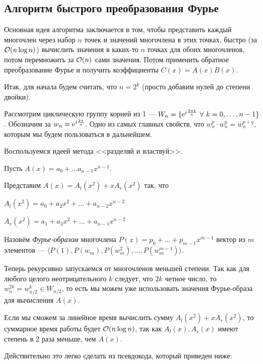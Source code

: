 \documentclass[a4paper, 12pt]{article}
\begin{document}
\subsection{Алгоритм быстрого преобразования Фурье}

Основная идея алгоритма заключается в том, чтобы представить каждый многочлен
через набор $n$ точек и значений многочлена в этих точках, быстро (за $\mathcal{O}(n\log n)$) вычислить значения в каких-то $n$ точках для обоих многочленов, потом
перемножить за $\mathcal{O}(n)$ сами значения. Потом применить обратное преобразование
Фурье и получить коэффициенты $C(x) = A(x)B(x)$.

Итак, для начала будем считать, что $n = 2^k$ (просто добавим нулей до степени двойки).

Рассмотрим циклическую группу корней из 1 --- $W_n = \{\e^{i\frac{2\pi k}{n}} \ 
\forall \ k = 0, \ldots, n - 1\}$. Обозначим за $w_n = \mathrm{e}^{i\frac{2\pi}{n}}$.
Одно из самых главных свойств, что $w_n^{p} \cdot w_n^{q} = w_n^{p + q}$,
которым мы будем пользоваться в дальнейшем.

Воспользуемся идеей метода <<разделяй и властвуй>>.

Пусть $A(x) = a_0 + \ldots a_{n - 1}x^{n - 1}$.

Представим $A(x) = A_l(x^2) + xA_r(x^2)$ так, что

\begin{center}
  $A_l(x^2) = a_0 + a_2x^2 + \ldots + a_{n - 2}x^{n - 2}$

  $A_r(x^2) = a_1 + a_3x^2 + \ldots + a_{n - 1}x^{n - 2}$
\end{center}

\begin{Def}
  \rm{Назовём \textit{Фурье-образом} многочлена $P(x) = p_0 + \ldots + 
  p_{m - 1}x^{m - 1}$ вектор из $m$ элементов ---  $\langle P(1), P(w_m), P(w_m^2), \ldots, P(w_m^{m - 1}) \rangle$.}
\end{Def}

Теперь рекурсивно запускаемся от многочленов меньшей степени. Так как для 
любого целого неотрицательного $k$ следует, что $2k$ четное число, то $w_n^{2k} = w_{n/2}^k \in W_{n/2}$,
то есть мы можем уже использовать значения Фурье-образа для вычисления $A(x)$.

Если мы сможем за линейное время вычислить сумму $A_l(x^2) + xA_r(x^2)$, то
суммарное время работы будет $\mathcal{O}(n\log n)$, так как $A_l(x), A_r(x)$ имеют степень
в 2 раза меньше, чем $A(x)$.

Действительно это легко сделать из псевдокода, который приведен ниже:
\end{document}
